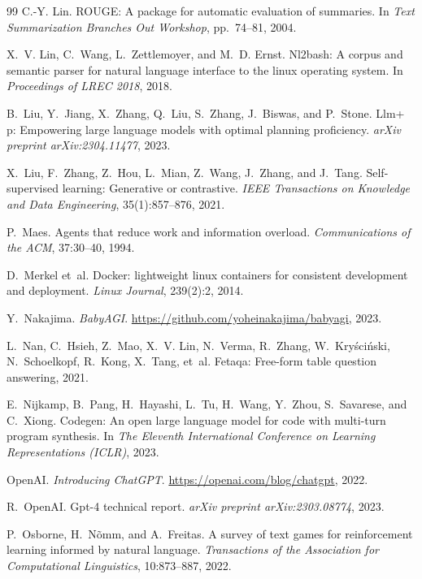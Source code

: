 \begin{thebibliography}{99}
C.-Y. Lin.
\newblock ROUGE: A package for automatic evaluation of summaries.
\newblock In \emph{Text Summarization Branches Out Workshop}, pp.\ 74--81,
2004.

X.~V. Lin, C.~Wang, L.~Zettlemoyer, and M.~D. Ernst.
\newblock Nl2bash: A corpus and semantic parser for natural language
interface to the linux operating system.
\newblock In \emph{Proceedings of LREC 2018}, 2018.

B.~Liu, Y.~Jiang, X.~Zhang, Q.~Liu, S.~Zhang, J.~Biswas, and P.~Stone.
\newblock Llm+ p: Empowering large language models with optimal planning
proficiency.
\newblock \emph{arXiv preprint arXiv:2304.11477}, 2023.

X.~Liu, F.~Zhang, Z.~Hou, L.~Mian, Z.~Wang, J.~Zhang, and J.~Tang.
\newblock Self-supervised learning: Generative or contrastive.
\newblock \emph{IEEE Transactions on Knowledge and Data Engineering},
35(1):857--876, 2021.

P.~Maes.
\newblock Agents that reduce work and information overload.
\newblock \emph{Communications of the ACM}, 37:30--40, 1994.

D.~Merkel et~al.
\newblock Docker: lightweight linux containers for consistent development
and deployment.
\newblock \emph{Linux Journal}, 239(2):2, 2014.

Y.~Nakajima.
\newblock \emph{BabyAGI}.
\newblock \url{https://github.com/yoheinakajima/babyagi}, 2023.

L.~Nan, C.~Hsieh, Z.~Mao, X.~V. Lin, N.~Verma, R.~Zhang,
W.~Kry\'sci\'nski, N.~Schoelkopf, R.~Kong, X.~Tang, et~al.
\newblock Fetaqa: Free-form table question answering, 2021.

E.~Nijkamp, B.~Pang, H.~Hayashi, L.~Tu, H.~Wang, Y.~Zhou, S.~Savarese,
and C.~Xiong.
\newblock Codegen: An open large language model for code with multi-turn
program synthesis.
\newblock In \emph{The Eleventh International Conference on Learning
Representations (ICLR)}, 2023.

OpenAI.
\newblock \emph{Introducing ChatGPT}.
\newblock \url{https://openai.com/blog/chatgpt}, 2022.

R.~OpenAI.
\newblock Gpt-4 technical report.
\newblock \emph{arXiv preprint arXiv:2303.08774}, 2023.

P.~Osborne, H.~N\~omm, and A.~Freitas.
\newblock A survey of text games for reinforcement learning informed by
natural language.
\newblock \emph{Transactions of the Association for Computational
Linguistics}, 10:873--887, 2022.


\end{thebibliography}
